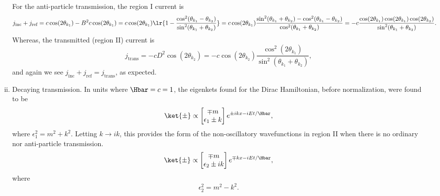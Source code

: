 \begin{enumerate}[(i)]
For the anti-particle transmission, the region I current is
%
\begin{dmath}\label{eqn:gradQuantumProblemSet4Problem3:1001}
j_{\textrm{inc}}
+ j_{\textrm{ref}}
=
c \cos( 2 \theta_{k_1} ) - B^2 c \cos( 2 \theta_{k_1} )
=
c \cos( 2 \theta_{k_1} )
\lr{ 1 -
\frac{ \cos^2(\theta_{k_1} - \theta_{k_2}) }{\sin^2(\theta_{k_1} + \theta_{k_2})} }
=
c \cos( 2 \theta_{k_1} )
\frac{ \sin^2(\theta_{k_1} + \theta_{k_2}) - \cos^2(\theta_{k_1} - \theta_{k_2}) }{\cos^2(\theta_{k_1} + \theta_{k_2})}
=
-c
\frac{ \cos( 2 \theta_{k_1} ) \cos(2 \theta_{k_1}) \cos(2 \theta_{k_2})}
{\sin^2(\theta_{k_1} + \theta_{k_2})}.
\end{dmath}
%
Whereas, the transmitted (region II) current is
\begin{dmath}\label{eqn:gradQuantumProblemSet4Problem3:1021}
j_{\textrm{trans}}
=
 -c D^2 \cos( 2 \theta_{k_2} )
=
 -c \cos( 2 \theta_{k_2} )
\frac{ \cos^2(2 \theta_{k_1}) }{\sin^2(\theta_{k_1} + \theta_{k_2})},
\end{dmath}
%
and again we see \( j_{\textrm{inc}} + j_{\textrm{ref}} = j_{\textrm{trans}} \), as expected.
\item Decaying transmission.
In units where \( \Hbar = c = 1 \), the eigenkets found for the Dirac Hamiltonian, before normalization, were found to be
%
\begin{equation}\label{eqn:gradQuantumProblemSet4Problem3:1041}
\ket{\pm} \propto
\begin{bmatrix}
\mp m \\
\epsilon_1 \pm k
\end{bmatrix}
e^{\pm i k x - i E t/\Hbar},
\end{equation}
%
where \( \epsilon_1^2 = m^2 + k^2 \).  Letting \( k \rightarrow i k \), this provides the form of the non-oscillatory wavefunctions in region II when there is no ordinary nor anti-particle transmission.
%
\begin{equation}\label{eqn:gradQuantumProblemSet4Problem3:1061}
\ket{\pm} \propto
\begin{bmatrix}
\mp m \\
\epsilon_2 \pm i k
\end{bmatrix}
e^{\mp k x - i E t/\Hbar},
\end{equation}
%
where
%
\begin{equation}\label{eqn:gradQuantumProblemSet4Problem3:1081}
\epsilon_2^2 = m^2 - k^2.
\end{equation}


\end{enumerate}
